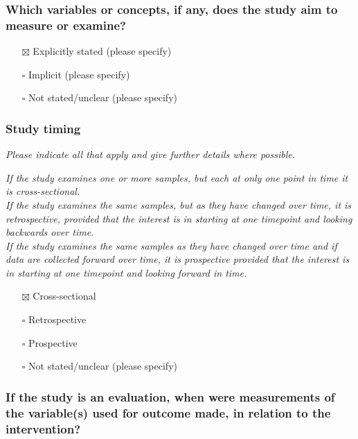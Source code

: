 \documentclass[
  doc, a4paper]{apa7}
\providecommand{\tightlist}{%
  \setlength{\itemsep}{0pt}\setlength{\parskip}{0pt}}
\begin{document}
\subsubsection{Which variables or concepts, if any, does the study aim to measure or examine?}\label{which-variables-or-concepts-if-any-does-the-study-aim-to-measure-or-examine}

\begin{itemize}
\tightlist
\item[$\boxtimes$]
  Explicitly stated (please specify)\\
\item[$\square$]
  Implicit (please specify)\\
\item[$\square$]
  Not stated/unclear (please specify)
\end{itemize}

\subsubsection{Study timing}\label{study-timing}

\emph{Please indicate all that apply and give further details where possible.}

\emph{If the study examines one or more samples, but each at only one point in time it is cross-sectional.}\\
\emph{If the study examines the same samples, but as they have changed over time, it is retrospective, provided that the interest is in starting at one timepoint and looking backwards over time.}\\
\emph{If the study examines the same samples as they have changed over time and if data are collected forward over time, it is prospective provided that the interest is in starting at one timepoint and looking forward in time.}

\begin{itemize}
\tightlist
\item[$\boxtimes$]
  Cross-sectional\\
\item[$\square$]
  Retrospective\\
\item[$\square$]
  Prospective\\
\item[$\square$]
  Not stated/unclear (please specify)
\end{itemize}

\subsubsection{If the study is an evaluation, when were measurements of the variable(s) used for outcome made, in relation to the intervention?}\label{if-the-study-is-an-evaluation-when-were-measurements-of-the-variables-used-for-outcome-made-in-relation-to-the-intervention}
\end{document}
